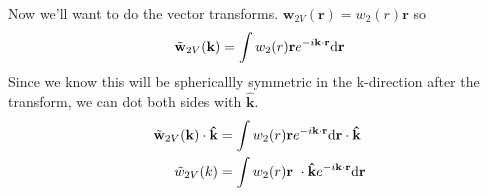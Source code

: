 \documentclass[letterpaper,twocolumn,amsmath,amssymb,prb]{revtex4-1}
\newcommand{\rr}{\textbf{r}}
\newcommand{\kk}{\textbf{k}}
\begin{document}
Now we'll want to do the vector transforms. $\mathbf{w}_{2V}(\rr) = w_2(r)\rr$ so
\begin{align}
  \tilde{\mathbf{w}}_{2V}(\kk) &= \int w_2(r)\rr e^{-i\kk \cdot \rr}
  \textrm{d\rr} \\
\end{align}
Since we know this will be sphericallly symmetric in the k-direction
after the transform, we can dot both sides with $\mathbf{\hat{k}}$.
\begin{align}
  \tilde{\mathbf{w}}_{2V}(\kk)\cdot \mathbf{\hat{k}} &= \int w_2(r)\rr e^{-i\kk \cdot \rr}
  \textrm{d\rr} \cdot \mathbf{\hat{k}} \\
  \tilde{w}_{2V}(k) &= \int w_2(r)\rr\ \cdot \mathbf{\hat{k}} e^{-i\kk \cdot \rr}
  \textrm{d\rr} \\
\end{align}
\end{document}
